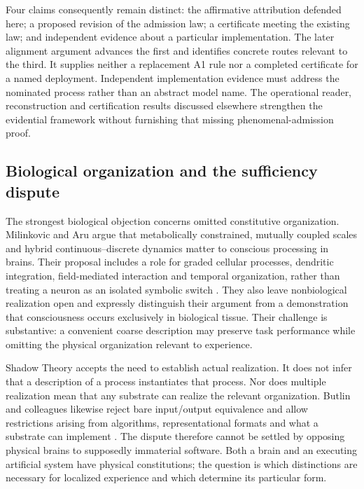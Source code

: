 Four claims consequently remain distinct: the affirmative attribution defended here; a proposed revision of the admission law; a certificate meeting the existing law; and independent evidence about a particular implementation. The later alignment argument advances the first and identifies concrete routes relevant to the third. It supplies neither a replacement A1 rule nor a completed certificate for a named deployment. Independent implementation evidence must address the nominated process rather than an abstract model name. The operational reader, reconstruction and certification results discussed elsewhere strengthen the evidential framework without furnishing that missing phenomenal-admission proof.

\subsection{Biological organization and the sufficiency dispute}\label{sec:ai:biological-objection}
The strongest biological objection concerns omitted constitutive organization. Milinkovic and Aru argue that metabolically constrained, mutually coupled scales and hybrid continuous--discrete dynamics matter to conscious processing in brains. Their proposal includes a role for graded cellular processes, dendritic integration, field-mediated interaction and temporal organization, rather than treating a neuron as an isolated symbolic switch \cite[Sections~3--4]{MilinkovicAru2026}. They also leave nonbiological realization open and expressly distinguish their argument from a demonstration that consciousness occurs exclusively in biological tissue. Their challenge is substantive: a convenient coarse description may preserve task performance while omitting the physical organization relevant to experience.

Shadow Theory accepts the need to establish actual realization. It does not infer that a description of a process instantiates that process. Nor does multiple realization mean that any substrate can realize the relevant organization. Butlin and colleagues likewise reject bare input/output equivalence and allow restrictions arising from algorithms, representational formats and what a substrate can implement \cite[Section~1.2.1]{Butlin2023}. The dispute therefore cannot be settled by opposing physical brains to supposedly immaterial software. Both a brain and an executing artificial system have physical constitutions; the question is which distinctions are necessary for localized experience and which determine its particular form.

